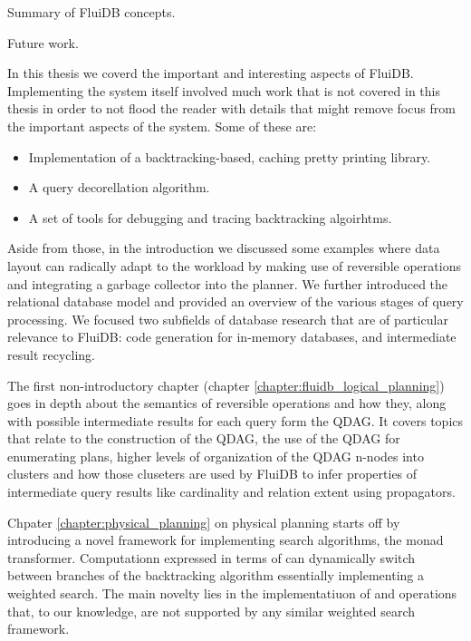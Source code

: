 
\begin{summary}
\item Summary of FluiDB concepts.
\item Future work.
\end{summary}


In this thesis we coverd the important and interesting aspects of
FluiDB. Implementing the system itself involved much work that is not
covered in this thesis in order to not flood the reader with details
that might remove focus from the important aspects of the system. Some
of these are:

\begin{itemize}
\item Implementation of a backtracking-based, caching pretty printing
  library.
\item A query decorellation algorithm.
\item A set of tools for debugging and tracing backtracking
  algoirhtms.
\end{itemize}

Aside from those, in the introduction we discussed some examples where
data layout can radically adapt to the workload by making use of
reversible operations and integrating a garbage collector into the
planner. We further introduced the relational database model and
provided an overview of the various stages of query processing. We
focused two subfields of database research that are of particular
relevance to FluiDB: code generation for in-memory databases, and
intermediate result recycling.

The first non-introductory chapter (chapter
\ref{chapter:fluidb_logical_planning}) goes in depth about the
semantics of reversible operations and how they, along with possible
intermediate results for each query form the QDAG. It covers topics
that relate to the construction of the QDAG, the use of the QDAG for
enumerating plans, higher levels of organization of the QDAG n-nodes
into clusters and how those cluseters are used by FluiDB to infer
properties of intermediate query results like cardinality and relation
extent using propagators.

Chpater \ref{chapter:physical_planning} on physical planning starts
off by introducing a novel framework for implementing search
algorithms, the  monad transformer. Computationn expressed
in terms of  can dynamically switch between branches of
the backtracking algorithm essentially implementing a weighted
search. The main novelty lies in the implementatiuon of 
and  operations that, to our knowledge, are not
supported by any similar weighted search framework.

